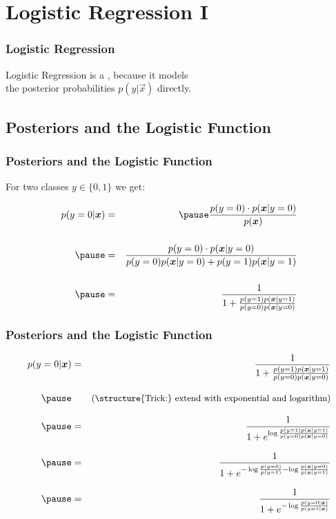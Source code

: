 \section{Logistic Regression I}

\begin{frame}
  \frametitle{Logistic Regression}

  Logistic Regression is a , because it models \\
  the posterior probabilities $p(y|\vec{x})$ directly.
\end{frame}


\subsection{Posteriors and the Logistic Function}

\begin{frame}
  \frametitle{Posteriors and the Logistic Function}
 
  For two classes $y\in\{0, 1\}$ we get:
  
  \begin{eqnarray*}
    p(y=0| \vec x) 
      &=& \pause \frac{p(y=0) \cdot p(\vec x | y=0)}{p(\vec x)} \\[.5cm] \pause 
      &=& \frac{p(y=0) \cdot p(\vec x | y=0)}{p(y=0)p(\vec x |y=0)+p(y=1)p(\vec x| y=1)} \\[.5cm] \pause
      &=& \frac{1}{1+\frac{p(y=1)p(\vec x| y=1)}{p(y=0)p(\vec x| y=0)}}
  \end{eqnarray*}
\end{frame}
 
 
\begin{frame}
  \frametitle{Posteriors and the Logistic Function \cont}

  \begin{eqnarray*}
    p(y=0| \vec x) 
      &=& \frac{1}{1+\frac{p(y=1)p(\vec x| y=1)}{p(y=0)p(\vec x| y=0)}} \\[.3cm] \pause
      &\phantom{=}& \mbox{\small (\structure{Trick:} extend with exponential and logarithm)} \\[.3cm] \pause
      &=& \frac{1}{1+e^{\log \frac{p(y=1)p(\vec x| y=1)}{p(y=0)p(\vec x| y=0)} } } \\[.3cm] \pause
      &=& \frac{1}{1+e^{-\log\frac{p(y=0)}{p(y=1)} - \log\frac{p(\vec x| y=0)}{p(\vec x|y=1)}}}\\[0.3cm] \pause
      &=& \frac{1}{1+e^{-\log\frac{p(y=0|\vec x)}{p(y=1|\vec x)}}}
  \end{eqnarray*}
\end{frame}


